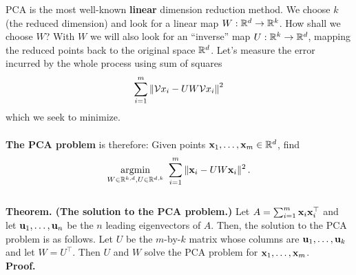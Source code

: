 PCA is the most well-known {\bf linear} dimension reduction method. 
We choose $k$ (the reduced dimension) and  look
for a linear map $W:\mathbb{R}^d\to\mathbb{R}^k$. How shall we choose $W$? With $W$ we will also
look for an ``inverse'' map $U:\mathbb{R}^k\to\mathbb{R}^d$, mapping the reduced points back to
the original space $\mathbb{R}^d$. Let's measure the error incurred by the whole process
using sum of squares
\[
           \sum_{i=1}^m\left\| \mathcal{V}{x}_i - UW\mathcal{V}{x}_i\right\|^2
         \]
which we seek to minimize.
\\~\\
{\bf The PCA problem} is therefore:
Given points ${\mathbf x}_1,\ldots,{\mathbf x}_m\in\mathbb{R}^d$, find
\[
  \operatorname*{argmin}_{W \in \mathbb{R}^{k,d}, U \in \mathbb{R}^{d,k}} \,\,\sum_{i=1}^m \|{\mathbf x}_i - U W
{\mathbf x}_i\|^2\,.
\]
~\\
{\bf Theorem. (The solution to the PCA problem.)}
Let $A = \sum_{i=1}^m {\mathbf x}_i {\mathbf x}_i^\top$ and let ${\mathbf u}_1,\ldots,{\mathbf u}_n$ be the $n$
leading eigenvectors of $A$. Then, the solution to the PCA problem is as
follows.  
Let $U$ be the $m$-by-$k$ matrix whose columns are 
${\mathbf u}_1,\ldots,{\mathbf u}_k$ and let $W = U^\top$. Then $U$ and $W$ solve the PCA
problem for ${\mathbf x}_1,\ldots,{\mathbf x}_m$.
~\\
{\bf Proof.}
